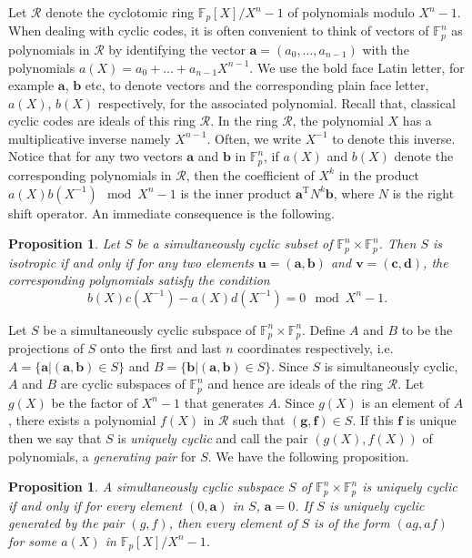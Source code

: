 \documentclass[conference]{IEEEtran}
\renewcommand{\=}{\approx}
\newcommand{\R}{\mathcal{R}}
\newcommand{\transpose}[1]{\ensuremath{#1^{\mathrm{T}}}}
\newtheorem{proposition}[theorem]{Proposition}
\begin{document}
Let $\R$ denote the cyclotomic ring $\mathbb{F}_p[X]/X^n -1$ of
polynomials modulo $X^n -1$. When dealing with cyclic codes, it is
often convenient to think of vectors of $\mathbb{F}_p^n$ as
polynomials in $\R$ by identifying the vector
$\mathbf{a}=(a_0,\ldots,a_{n-1})$ with the polynomials $a(X) = a_0 +
\ldots + a_{n-1} X^{n-1}$. We use the bold face Latin letter, for
example $\mathbf{a}$, $\mathbf{b}$ etc, to denote vectors and the
corresponding plain face letter, $a(X)$, $b(X)$ respectively, for the
associated polynomial.  Recall that, classical cyclic codes are ideals
of this ring $\R$. In the ring $\R$, the polynomial $X$ has a
multiplicative inverse namely $X^{n-1}$. Often, we write $X^{-1}$ to
denote this inverse.  Notice that for any two vectors $\mathbf{a}$ and
$\mathbf{b}$ in $\mathbb{F}_p^n$, if $a(X)$ and $b(X)$ denote the
corresponding polynomials in $\R$, then the coefficient of $X^k$ in
the product $a(X)b(X^{-1})\mod X^n -1$ is the inner product
$\transpose{\mathbf{a}}N^k\mathbf{b}$, where $N$ is the right shift
operator. An immediate consequence is the following.

\begin{proposition}\label{prop:isotropy-polynomials}
  Let $S$ be a simultaneously cyclic subset of $\mathbb{F}_p^n \times
  \mathbb{F}_p^n$. Then $S$ is isotropic if and only if for any two
  elements $\mathbf{u} = (\mathbf{a},\mathbf{b})$ and $\mathbf{v} =
  (\mathbf{c},\mathbf{d})$, the corresponding polynomials satisfy the
  condition
  \[
  b(X)c(X^{-1}) - a(X)d(X^{-1}) = 0 \mod X^n -1.
  \]
\end{proposition}


Let $S$ be a simultaneously cyclic subspace of $\mathbb{F}_p^{n}\times
\mathbb{F}_p^n$.  Define $A$ and $B$ to be the projections of $S$ onto
the first and last $n$ coordinates respectively, i.e. $A=\{ \mathbf{a}
| (\mathbf{a},\mathbf{b}) \in S \}$ and $B = \{ \mathbf{b} |
(\mathbf{a},\mathbf{b}) \in S \}$. Since $S$ is simultaneously cyclic,
$A$ and $B$ are cyclic subspaces of $\mathbb{F}_p^n$ and hence are
ideals of the ring $\R$. Let $g(X)$ be the factor of $X^n - 1$ that
generates $A$. Since $g(X)$ is an element of $A$, there exists a
polynomial $f(X)$ in $\R$ such that $(\mathbf{g},\mathbf{f}) \in
S$. If this $\mathbf{f}$ is unique then we say that $S$ is
\emph{uniquely cyclic} and call the pair $(g(X),f(X))$ of polynomials,
a \emph{generating pair} for $S$. We have the following proposition.

\begin{proposition}\label{prop:uniquely-cyclic}
  A simultaneously cyclic subspace $S$ of $\mathbb{F}_p^n \times
  \mathbb{F}_p^n$ is uniquely cyclic if and only if for every element
  $(0,\mathbf{a})$ in $S$, $\mathbf{a} = 0$. If $S$ is uniquely cyclic
  generated by the pair $(g,f)$, then every element of $S$ is of the
  form $(a g, a f)$ for some $a(X)$ in $\mathbb{F}_p[X]/X^n -1$.
\end{proposition}
\end{document}
